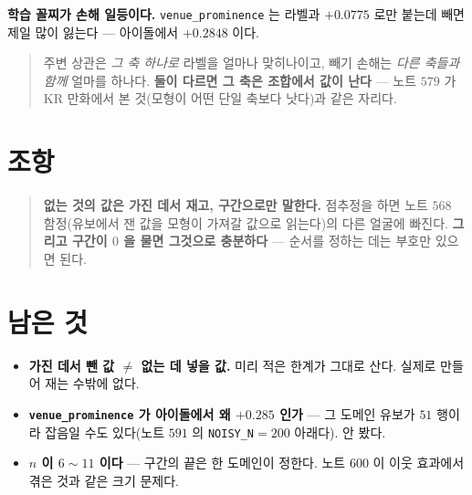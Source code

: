 \documentclass[11pt]{article}
\begin{document}
\textbf{학습 꼴찌가 손해 일등이다.} \texttt{venue\_prominence} 는 라벨과
$+0.0775$ 로만 붙는데 빼면 제일 많이 잃는다 --- 아이돌에서 $+0.2848$ 이다.

\begin{quote}
주변 상관은 \emph{그 축 하나로} 라벨을 얼마나 맞히나이고, 빼기 손해는
\emph{다른 축들과 함께} 얼마를 하나다. \textbf{둘이 다르면 그 축은
조합에서 값이 난다} --- 노트 $579$ 가 KR 만화에서 본 것(모형이 어떤 단일
축보다 낫다)과 같은 자리다.
\end{quote}

\section*{조항}

\begin{quote}
\textbf{없는 것의 값은 가진 데서 재고, 구간으로만 말한다.} 점추정을 하면
노트 $568$ 함정(유보에서 잰 값을 모형이 가져갈 값으로 읽는다)의 다른
얼굴에 빠진다. \textbf{그리고 구간이 $0$ 을 물면 그것으로 충분하다} ---
순서를 정하는 데는 부호만 있으면 된다.
\end{quote}

\section*{남은 것}

\begin{itemize}
\item \textbf{가진 데서 뺀 값 $\neq$ 없는 데 넣을 값.} 미리 적은 한계가
그대로 산다. 실제로 만들어 재는 수밖에 없다.
\item \textbf{\texttt{venue\_prominence} 가 아이돌에서 왜 $+0.285$ 인가} ---
그 도메인 유보가 $51$ 행이라 잡음일 수도 있다(노트 $591$ 의
\texttt{NOISY\_N}$=200$ 아래다). 안 봤다.
\item \textbf{$n$ 이 $6\!\sim\!11$ 이다} --- 구간의 끝은 한 도메인이 정한다.
노트 $600$ 이 이웃 효과에서 겪은 것과 같은 크기 문제다.
\end{itemize}
\end{document}
